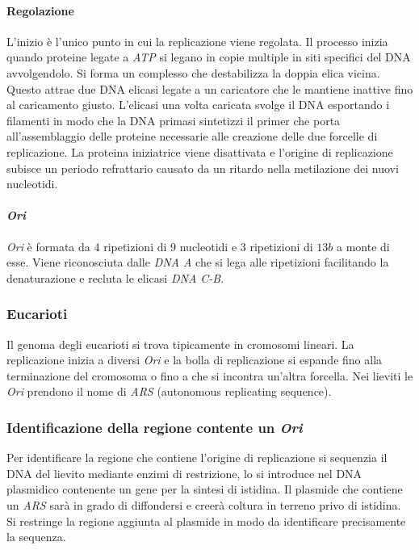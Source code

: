 			\paragraph{Regolazione}
			L'inizio \`e l'unico punto in cui la replicazione viene regolata.
			Il processo inizia quando proteine legate a \emph{ATP} si legano in copie multiple in siti specifici del DNA avvolgendolo.
			Si forma un complesso che destabilizza la doppia elica vicina.
			Questo attrae due DNA elicasi legate a un caricatore che le mantiene inattive fino al caricamento giusto.
			L'elicasi una volta caricata svolge il DNA esportando i filamenti in modo che la DNA primasi sintetizzi il primer che porta all'assemblaggio delle proteine  necessarie alle creazione delle due forcelle di replicazione.
			La proteina iniziatrice viene disattivata e l'origine di replicazione subisce un periodo refrattario causato da un ritardo nella metilazione dei nuovi nucleotidi.

			\paragraph{\emph{Ori}}
			\emph{Ori} \`e formata da $4$ ripetizioni di $9$ nucleotidi e $3$ ripetizioni di $13b$ a monte di esse.
			Viene riconosciuta dalle \emph{DNA A} che si lega alle ripetizioni facilitando la denaturazione e recluta le elicasi \emph{DNA C-B}.

		\subsubsection{Eucarioti}
		Il genoma degli eucarioti si trova tipicamente in cromosomi lineari.
		La replicazione inizia a diversi \emph{Ori} e la bolla di replicazione si espande fino alla terminazione del cromosoma o fino a che si incontra un'altra forcella.
		Nei lieviti le \emph{Ori} prendono il nome di \emph{ARS} (autonomous replicating sequence).

		\subsubsection{Identificazione della regione contente un \emph{Ori}}
		Per identificare la regione che contiene l'origine di replicazione si sequenzia il DNA del lievito mediante enzimi di restrizione, lo si introduce nel DNA plasmidico contenente un gene per la sintesi di istidina.
		Il plasmide che contiene un \emph{ARS} sar\`a in grado di diffondersi e creer\`a coltura in terreno privo di istidina.
		Si restringe la regione aggiunta al plasmide in modo da identificare precisamente la sequenza.

